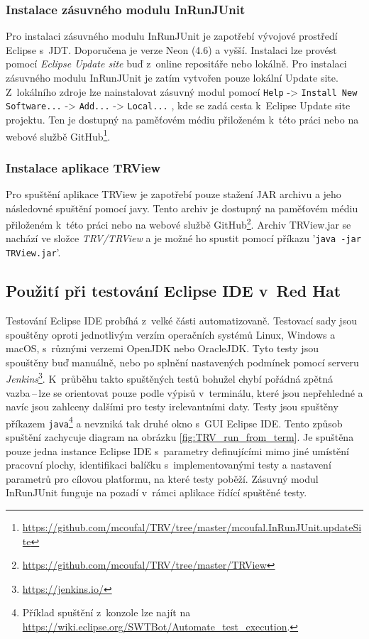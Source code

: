       \subsubsection{Instalace zásuvného modulu InRunJUnit}
      Pro instalaci zásuvného modulu InRunJUnit je zapotřebí vývojové prostředí Eclipse s~JDT. Doporučena je verze Neon (4.6) a vyšší. Instalaci lze provést pomocí \emph{Eclipse Update site} buď z~online repositáře nebo lokálně. Pro instalaci zásuvného modulu InRunJUnit je zatím vytvořen pouze lokální Update site. Z~lokálního zdroje lze nainstalovat zásuvný modul pomocí \texttt{Help} -> \texttt{Install New Software...} -> \texttt{Add...} -> \texttt{Local...} , kde se zadá cesta k~Eclipse Update site projektu. Ten je dostupný na paměťovém médiu přiloženém k~této práci nebo na webové službě GitHub\footnote{\url{https://github.com/mcoufal/TRV/tree/master/mcoufal.InRunJUnit.updateSite}}.

      \subsubsection{Instalace aplikace TRView}
      Pro spuštění aplikace TRView je zapotřebí pouze stažení JAR archivu a jeho následovné spuštění pomocí javy. Tento archiv je dostupný na paměťovém médiu přiloženém k~této práci nebo na webové službě GitHub\footnote{\url{https://github.com/mcoufal/TRV/tree/master/TRView}}. Archiv TRView.jar se nachází ve složce \emph{TRV/TRView} a je možné ho spustit pomocí příkazu '\texttt{java -jar TRView.jar}'.

    \subsection{Použití při testování Eclipse IDE v~Red Hat}
    Testování Eclipse IDE probíhá z~velké části automatizovaně. Testovací sady jsou spouštěny oproti jednotlivým verzím operačních systémů Linux, Windows a macOS, s~různými verzemi OpenJDK nebo OracleJDK. Tyto testy jsou spouštěny buď manuálně, nebo po splnění nastavených podmínek pomocí serveru \emph{Jenkins}\footnote{\url{https://jenkins.io/}}. K~průběhu takto spuštěných testů bohužel chybí pořádná zpětná vazba\,--\,lze se orientovat pouze podle výpisů v~terminálu, které jsou nepřehledné a navíc jsou zahlceny dalšími pro testy irelevantními daty. Testy jsou spuštěny příkazem \texttt{java}\footnote{Příklad spuštění z~konzole lze najít na \url{https://wiki.eclipse.org/SWTBot/Automate_test_execution}.} a nevzniká tak druhé okno s~GUI Eclipse IDE. Tento způsob spuštění zachycuje diagram na obrázku \ref{fig:TRV_run_from_term}. Je spuštěna pouze jedna instance Eclipse IDE s~parametry definujícími mimo jiné umístění pracovní plochy, identifikaci balíčku s~implementovanými testy a nastavení parametrů pro cílovou platformu, na které testy poběží. Zásuvný modul InRunJUnit funguje na pozadí v~rámci aplikace řídící spuštěné testy.

